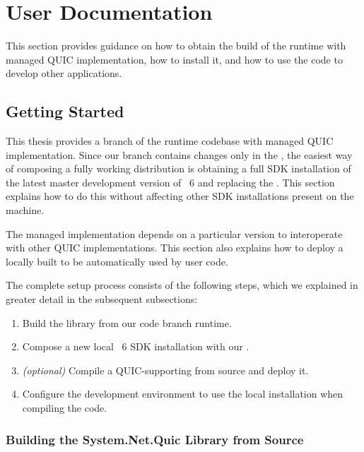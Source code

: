 \chapter{User Documentation}\label{chap:06-user-docs}

This section provides guidance on how to obtain the build of the \dotnet{} runtime with managed QUIC
implementation, how to install it, and how to use the code to develop other applications.

\section{Getting Started}

This thesis provides a branch of the \dotnet{} runtime codebase with managed QUIC implementation.
Since our branch contains changes only in the \SystemNetQuicDll{}, the easiest way of composing a
fully working \dotnet{} distribution is obtaining a full SDK installation of the latest master
development version of \dotnet{}~6 and replacing the \SystemNetQuicDll{}. This section explains how
to do this without affecting other \dotnet{} SDK installations present on the machine.

The managed implementation depends on a particular \libopenssl{} version to interoperate with other
QUIC implementations. This section also explains how to deploy a locally built \libopenssl{} to be
automatically used by user code.

The complete setup process consists of the following steps, which we explained in greater detail in
the subsequent subsections:

\begin{enumerate}

  \item Build the \SystemNetQuicDll{} library from our code branch runtime.

  \item Compose a new local \dotnet{}~6 SDK installation with our \SystemNetQuicDll{}.

  \item \textit{(optional)} Compile a QUIC-supporting \libopenssl{} from source and deploy it.

  \item Configure the development environment to use the local installation when compiling the code.

\end{enumerate}

\subsection{Building the System.Net.Quic Library from Source}\label{sec:06-build-runtime}

